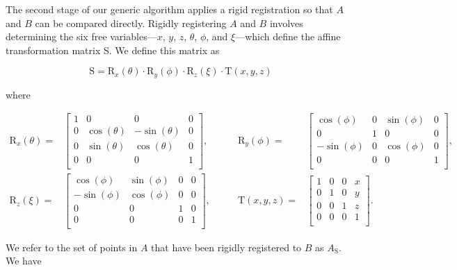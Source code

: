 \documentclass[12pt]{article}
\begin{document}
The second stage of our generic algorithm applies a rigid registration so that $A$ and $B$ can be compared directly.  Rigidly registering $A$ and $B$ involves determining the six free variables---$x$, $y$, $z$, $\theta$, $\phi$, and $\xi$---which define the affine transformation matrix S.  We define this matrix as

$$
\mathrm{S} = \mathrm{R}_x(\theta) \cdot \mathrm{R}_y(\phi) \cdot \mathrm{R}_z(\xi) \cdot \mathrm{T}(x, y, z)
$$

where

$$
\begin{align*}
    \mathrm{R}_x(\theta) =&
    \begin{bmatrix}
        1 & 0 & 0 & 0\\
        0 & \cos(\theta) & -\sin(\theta) & 0\\
        0 & \sin(\theta) & \cos(\theta) & 0\\
        0 & 0 & 0 & 1\\
    \end{bmatrix},&\quad\quad
    \mathrm{R}_y(\phi) =&
    \begin{bmatrix}
        \cos(\phi) & 0 & \sin(\phi) & 0\\
        0 & 1 & 0 & 0\\
        -\sin(\phi) & 0 & \cos(\phi) & 0\\
        0 & 0 & 0 & 1\\
    \end{bmatrix},
    \\
    \mathrm{R}_z(\xi) =&
    \begin{bmatrix}
        \cos(\phi) & \sin(\phi) & 0 & 0\\
        -\sin(\phi) & \cos(\phi) & 0 & 0\\
        0 & 0 & 1 & 0\\
        0 & 0 & 0 & 1\\
    \end{bmatrix},&\quad\quad
    \mathrm{T}(x, y, z) =&
    \begin{bmatrix}
        1 & 0 & 0 & x\\
        0 & 1 & 0 & y\\
        0 & 0 & 1 & z\\
        0 & 0 & 0 & 1\\
    \end{bmatrix}.
\end{align*}
$$

We refer to the set of points in $A$ that have been rigidly registered to $B$ as $A_\textrm{S}$.  We have
\end{document}

